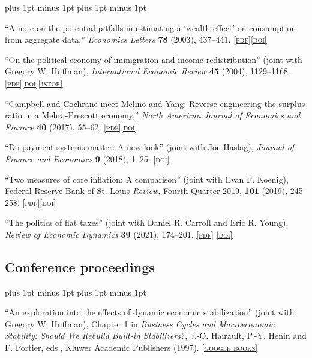 \documentclass[letterpaper]{article}
\renewenvironment{itemize}{
  \begin{list}{}{
    \setlength{\leftmargin}{1.5em}
    \itemsep -1pt plus 1pt minus 1pt
    \topsep -1pt plus 1pt minus 1pt
  }
}{
  \end{list}
}
\newcommand{\jstor}[1]{\href{#1}{\scriptsize\textsc{[jstor]}}}
\newcommand{\pdf}[1]{\href{#1}{\scriptsize\textsc{[pdf]}}}
\newcommand{\doi}[1]{\href{http://dx.doi.org/#1}{\scriptsize\textsc{[doi]}}}
\begin{document}
\begin{itemize}
\item ``A note on the potential pitfalls in estimating a `wealth effect' on consumption from aggregate data,'' \textit{Economics Letters} \textbf{78} (2003), 437--441. \pdf{https://jimdolmas.github.io/assets/wealth_effect.pdf}\doi{10.1016/S0165-1765(02)00249-5}

\item ``On the political economy of immigration and income redistribution'' (joint with Gregory W. Huffman), \textit{International Economic Review} \textbf{45} (2004), 1129--1168. \pdf{https://jimdolmas.github.io/assets/dolmas_huffman_ier.pdf}\doi{10.1111/j.0020-6598.2004.00300.x}\jstor{http://www.jstor.org/stable/3663622}

\item ``Campbell and Cochrane meet Melino and Yang: Reverse engineering the surplus ratio in a Mehra-Prescott economy,'' \textit{North American Journal of Economics and Finance} \textbf{40} (2017), 55--62. \pdf{https://jimdolmas.github.io/assets/ccmpmy.pdf}\doi{10.1016/j.najef.2017.01.006}

\item ``Do payment systems matter: A new look'' (joint with Joe Haslag), \textit{Journal of Finance and Economics} \textbf{9} (2018), 1--25. \doi{10.12735/jfe.v9n1p1}

\item ``Two measures of core inflation: A comparison'' (joint with Evan F. Koenig), Federal Reserve Bank of St. Louis \textit{Review}, Fourth Quarter 2019, \textbf{101} (2019), 245--258. \pdf{https://jimdolmas.github.io/assets/two-measures-of-core-inflation-a-comparison.pdf}\doi{10.20955/r.101.245-58}

\item ``The politics of flat taxes'' (joint with Daniel R. Carroll and Eric R. Young), \textit{Review of Economic Dynamics} \textbf{39} (2021), 174--201. \pdf{https://jimdolmas.github.io/assets/cdy_RED_in_press.pdf} \doi{10.1016/j.red.2020.06.016}
\end{itemize}

\subsection*{Conference proceedings}
\begin{itemize}
\item ``An exploration into the effects of dynamic economic stabilization'' (joint with Gregory W. Huffman), Chapter 1 in \textit{Business Cycles and Macroeconomic Stability: Should We Rebuild Built-in Stabilizers?}, {J.-O.} Hairault, {P.-Y.} Henin and F. Portier, eds., Kluwer Academic Publishers (1997). \href{http://books.google.com/books?id=cJYTNAu3GxUC&lpg=PP1&pg=PA3#v=onepage&q&f=false}{\scriptsize\textsc{[google books]}}
\end{itemize}
\end{document}
